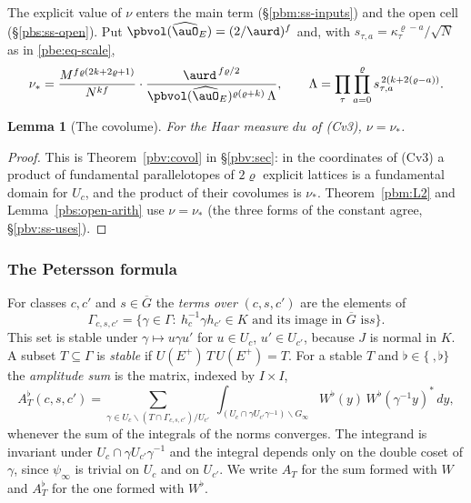 \documentclass[10pt]{amsart}
\newtheorem{lemma}[theorem]{Lemma}
\theoremstyle{definition}
\theoremstyle{remark}
\providecommand{\auG}{\overline G}
\begin{document}
The explicit value of $\nu$ enters the main term (\S\ref{pbm:ss-inputs}) and the open cell
(\S\ref{pbs:ss-open}). Put $\pbvol(\widehat\auO_E)=(2/\aurd)^f$ and, with $s_{\tau,a}=\kappa_\tau^{\varrho-a}/
\sqrt N$ as in \eqref{pbe:eq-scale},
\[
\nu_*=\frac{M^{f\varrho(2k+2\varrho+1)}}{N^{kf}}\cdot\frac{\aurd^{\,f\varrho/2}}{\pbvol(\widehat\auO_E)^{\varrho(\varrho+k)}\,
\Lambda},\qquad\Lambda=\prod_\tau\prod_{a=0}^{\varrho}s_{\tau,a}^{\,2(k+2(\varrho-a))}.
\]

\begin{lemma}[The covolume]\label{pb:covol}
For the Haar measure $du$ of \textup{(Cv3)}, $\nu=\nu_*$.
\end{lemma}
\begin{proof}
This is Theorem~\ref{pbv:covol} in \S\ref{pbv:sec}: in the coordinates of (Cv3) a product of fundamental
parallelotopes of $2\varrho$ explicit lattices is a fundamental domain for $U_c$, and the product of their
covolumes is $\nu_*$. Theorem~\ref{pbm:L2} and Lemma~\ref{pbs:open-arith} use $\nu=\nu_*$ (the three forms of
the constant agree, \S\ref{pbv:ss-uses}).
\end{proof}

\subsubsection*{The Petersson formula}
For classes $c,c'$ and $s\in\auG$ the \emph{terms over} $(c,s,c')$ are the elements of
\[
\Gamma_{c,s,c'}=\{\gamma\in\Gamma:\ h_c^{-1}\gamma h_{c'}\in K\text{ and its image in }\auG\text{ is
}s\}.
\]
This set is stable under $\gamma\mapsto u\gamma u'$ for $u\in U_c$, $u'\in U_{c'}$, because $J$ is
normal in $K$. A subset $T\subseteq\Gamma$ is \emph{stable} if $U(E^+)\,T\,U(E^+)=T$. For a stable
$T$ and $\flat\in\{\ ,\flat\}$ the \emph{amplitude sum} is the matrix, indexed by $I\times I$,
\begin{equation}\label{pb:eq-amp}
A^{\flat}_T(c,s,c')=\sum_{\gamma\in U_c\backslash(T\cap\Gamma_{c,s,c'})/U_{c'}}\ \int_{(U_c\cap\gamma
U_{c'}\gamma^{-1})\backslash G_\infty}W^{\flat}(y)\,W^{\flat}(\gamma^{-1}y)^*\,dy ,
\end{equation}
whenever the sum of the integrals of the norms converges. The integrand is invariant under
$U_c\cap\gamma U_{c'}\gamma^{-1}$ and the integral depends only on the double coset of $\gamma$,
since $\psi_\infty$ is trivial on $U_c$ and on $U_{c'}$. We write $A_T$ for the sum formed with
$W$ and $A_T^\flat$ for the one formed with $W^\flat$.
\end{document}
